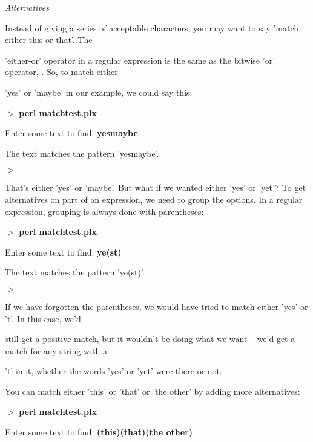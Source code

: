 \documentclass[a4paper,11pt]{book}
\begin{document}
\noindent 

\noindent \textit{Alternatives}

\noindent Instead of giving a series of acceptable characters, you may want to say 'match either this or that'. The

\noindent 'either-or' operator in a regular expression is the same as the bitwise 'or' operator, \textbar . So, to match either

\noindent 'yes' or 'maybe' in our example, we could say this:

\noindent 

\noindent $>$ \textbf{perl matchtest.plx}

\noindent Enter some text to find: \textbf{yes\textbar maybe}

\noindent The text matches the pattern 'yes\textbar maybe'.

\noindent $>$

\noindent 

\noindent That's either 'yes'  or 'maybe'.  But  what  if  we wanted  either  'yes'  or  'yet'?  To  get alternatives  on part  of an expression,  we  need  to  group  the  options.  In  a  regular  expression,  grouping  is  always done with parentheses:

\noindent 

\noindent $>$ \textbf{perl matchtest.plx}

\noindent Enter some text to find: \textbf{ye(s\textbar t)}

\noindent The text matches the pattern 'ye(s\textbar t)'.

\noindent $>$

\noindent 

\noindent If we have forgotten the parentheses, we would have tried to match either 'yes' or 't'. In this case, we'd

\noindent still get a positive match, but it wouldn't be doing what we want -- we'd get a match for any string with a

\noindent 't' in it, whether the words 'yes' or 'yet' were there or not.

\noindent 

\noindent 

\noindent You can match either 'this' or 'that' or 'the other' by adding more alternatives:

\noindent 

\noindent $>$ \textbf{perl matchtest.plx}

\noindent Enter some text to find: \textbf{(this)\textbar (that)\textbar (the other)}
\end{document}
